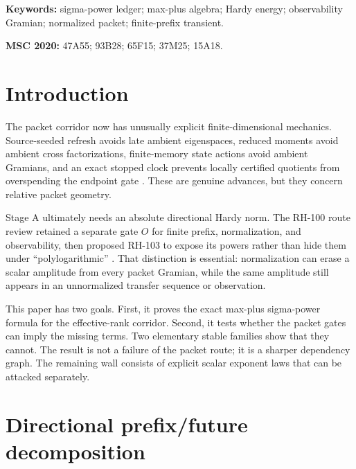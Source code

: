 \documentclass[11pt]{article}
\theoremstyle{definition}
\theoremstyle{remark}
\begin{document}
\noindent\textbf{Keywords:} sigma-power ledger; max-plus algebra; Hardy
energy; observability Gramian; normalized packet; finite-prefix transient.

\medskip
\noindent\textbf{MSC 2020:} 47A55; 93B28; 65F15; 37M25; 15A18.

\section{Introduction}

The packet corridor now has unusually explicit finite-dimensional mechanics.
Source-seeded refresh avoids late ambient eigenspaces, reduced moments avoid
ambient cross factorizations, finite-memory state actions avoid ambient
Gramians, and an exact stopped clock prevents locally certified quotients from
overspending the endpoint gate
\citep{WangSourceSeeded2026,WangFiniteMemory2026,WangStoppedClock2026}.
These are genuine advances, but they concern relative packet geometry.

Stage A ultimately needs an absolute directional Hardy norm.  The RH-100
route review retained a separate gate $O$ for finite prefix, normalization,
and observability, then proposed RH-103 to expose its powers rather than hide
them under ``polylogarithmic'' \citep{WangHundredLayer2026}.  That distinction
is essential: normalization can erase a scalar amplitude from every packet
Gramian, while the same amplitude still appears in an unnormalized transfer
sequence or observation.

This paper has two goals.  First, it proves the exact max-plus sigma-power
formula for the effective-rank corridor.  Second, it tests whether the packet
gates can imply the missing terms.  Two elementary stable families show that
they cannot.  The result is not a failure of the packet route; it is a sharper
dependency graph.  The remaining wall consists of explicit scalar exponent
laws that can be attacked separately.

\section{Directional prefix/future decomposition}
\label{sec:decomposition}
\end{document}
